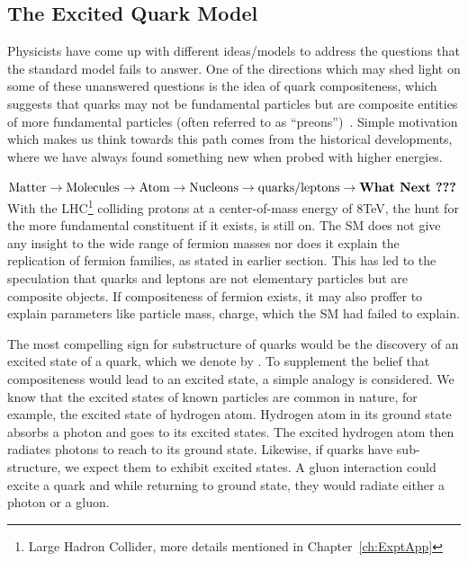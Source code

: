 \subsection{The Excited Quark Model}\label{Se:qstarTheory}
Physicists have come up with different ideas/models to address the questions that the standard model fails to answer. 
One of the directions which may shed light on some of these unanswered questions is the idea of quark compositeness, which suggests that 
quarks may not be fundamental particles but are composite entities of more fundamental particles (often referred to as ``preons'')~\cite{Pati:1975md,Eichten:1983hw,Baur:1987ga,Baur:1989kv}.
Simple motivation which makes us think towards this path comes from the historical developments, where we have always found something new when 
probed with higher energies. 

$\text{Matter}\to\text{Molecules}\to\text{Atom}\to\text{Nucleons}\to\text{quarks/leptons}\to\text{\bf What Next ???}$ \\
With the LHC\footnote{Large Hadron Collider, more details mentioned in Chapter~\ref{ch:ExptApp}} colliding protons at a center-of-mass energy 
of 8\unit{TeV}, the hunt for the more fundamental constituent if it exists, is still on.
The SM does not give any insight to the wide range of fermion masses nor does it explain the replication of fermion families, as stated in earlier 
section. This has led to the speculation that quarks and leptons are not elementary particles but are composite objects. If compositeness of 
fermion exists, it may also proffer to explain parameters like particle mass, charge, which the SM had failed to explain. 

The most compelling sign for substructure of quarks would be the discovery of an excited state of a quark, which we denote by \qstar.
To supplement the belief that compositeness would lead to an excited state, a simple analogy is considered. We know that the excited
states of known particles are common in nature, for example, the excited state of hydrogen atom. Hydrogen atom in its ground state absorbs
a photon and goes to its excited states. The excited hydrogen atom then radiates photons to reach to its ground state. Likewise, if quarks
have sub-structure, we expect them to exhibit excited states. A gluon interaction could excite a quark and while returning to ground state, 
they would radiate either a photon or a gluon. 

